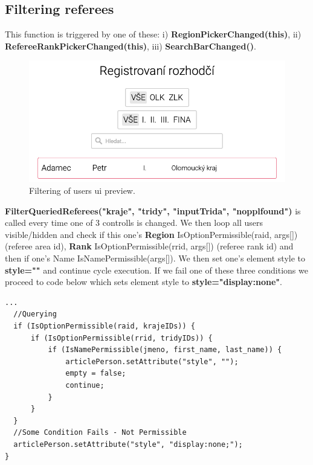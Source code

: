 \subsection{Filtering referees}
This function is triggered by one of these: 
\newline i) \textbf{RegionPickerChanged(this)}, 
\newline ii) \textbf{RefereeRankPickerChanged(this)},
\newline iii) \textbf{SearchBarChanged()}.
\newline
\begin{figure}[h]	
	\centering
\includegraphics[scale=0.441]{img/filtering-preview.png}
\caption{Filtering of users ui preview.}
\label{fig3.1:filtering}
\end{figure}
\newline
\textbf{FilterQueriedReferees("kraje", "tridy", "inputTrida", "nopplfound")} is called every time one of 3 controlls is changed. We then loop all users visible/hidden and check if this one's \textbf{Region} IsOptionPermissible(raid, args[]) (referee area id), \textbf{Rank} IsOptionPermissible(rrid, args[]) (referee rank id) and then if one's Name IsNamePermissible(args[]). We then set one's element style to \textbf{style=""} and continue cycle execution. If we fail one of these three conditions we proceed to code below which sets element style to \textbf{style="display:none"}.
\begin{lstlisting}
...  
  //Querying
  if (IsOptionPermissible(raid, krajeIDs)) {
      if (IsOptionPermissible(rrid, tridyIDs)) {
          if (IsNamePermissible(jmeno, first_name, last_name)) {
              articlePerson.setAttribute("style", "");
              empty = false;
              continue;
          }
      }
  }
  //Some Condition Fails - Not Permissible
  articlePerson.setAttribute("style", "display:none;");
}  
\end{lstlisting}
